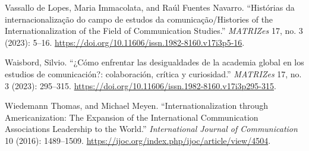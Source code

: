 \documentclass{tufte-handout}
\begin{document}
\begin{hangparas}{.25in}{1}
Vassallo de Lopes, Maria Immacolata, and Raúl Fuentes Navarro.
``Histórias da internacionalização do campo de estudos da
comunicação/Histories of the Internationalization of the Field of
Communication Studies.'' \emph{MATRIZes} 17, no. 3 (2023): 5--16.
\url{https://doi.org/10.11606/issn.1982-8160.v17i3p5-16}.

Waisbord, Silvio. ``¿Cómo enfrentar las desigualdades de la academia
global en los estudios de comunicación?: colaboración, crítica y
curiosidad.'' \emph{MATRIZes} 17, no. 3 (2023): 295--315.
\url{https://doi.org/10.11606/issn.1982-8160.v17i3p295-315}.

Wiedemann Thomas, and Michael Meyen. ``Internationalization through
Americanization: The Expansion of the International Communication
Association\textquotesingle s Leadership to the World.''
\emph{International Journal of Communication} 10 (2016): 1489--1509.
\url{https://ijoc.org/index.php/ijoc/article/view/4504}.



\end{hangparas}
\end{document}
